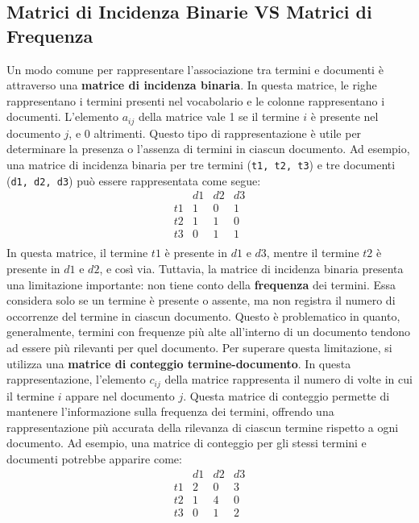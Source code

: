 \documentclass{report}
\begin{document}
	\subsection{Matrici di Incidenza Binarie VS Matrici di Frequenza}
	Un modo comune per rappresentare l'associazione tra termini e documenti è attraverso una \textbf{matrice di incidenza binaria}. In questa matrice, le righe rappresentano i termini presenti nel vocabolario e le colonne rappresentano i documenti. L'elemento \( a_{ij} \) della matrice vale 1 se il termine \( i \) è presente nel documento \( j \), e 0 altrimenti. Questo tipo di rappresentazione è utile per determinare la presenza o l'assenza di termini in ciascun documento.
	Ad esempio, una matrice di incidenza binaria per tre termini (\texttt{t1, t2, t3}) e tre documenti (\texttt{d1, d2, d3}) può essere rappresentata come segue:
	\[
	\begin{array}{c|ccc}
	& d1 & d2 & d3 \\
	\hline
	t1 & 1 & 0 & 1 \\
	t2 & 1 & 1 & 0 \\
	t3 & 0 & 1 & 1 \\
	\end{array}
	\]
	In questa matrice, il termine \( t1 \) è presente in \( d1 \) e \( d3 \), mentre il termine \( t2 \) è presente in \( d1 \) e \( d2 \), e così via.
	Tuttavia, la matrice di incidenza binaria presenta una limitazione importante: non tiene conto della \textbf{frequenza} dei termini. Essa considera solo se un termine è presente o assente, ma non registra il numero di occorrenze del termine in ciascun documento. Questo è problematico in quanto, generalmente, termini con frequenze più alte all'interno di un documento tendono ad essere più rilevanti per quel documento.
	Per superare questa limitazione, si utilizza una \textbf{matrice di conteggio termine-documento}. In questa rappresentazione, l'elemento \( c_{ij} \) della matrice rappresenta il numero di volte in cui il termine \( i \) appare nel documento \( j \). Questa matrice di conteggio permette di mantenere l'informazione sulla frequenza dei termini, offrendo una rappresentazione più accurata della rilevanza di ciascun termine rispetto a ogni documento.
	Ad esempio, una matrice di conteggio per gli stessi termini e documenti potrebbe apparire come:
	\[
	\begin{array}{c|ccc}
	& d1 & d2 & d3 \\
	\hline
	t1 & 2 & 0 & 3 \\
	t2 & 1 & 4 & 0 \\
	t3 & 0 & 1 & 2 \\
	\end{array}
	\]
\end{document}
